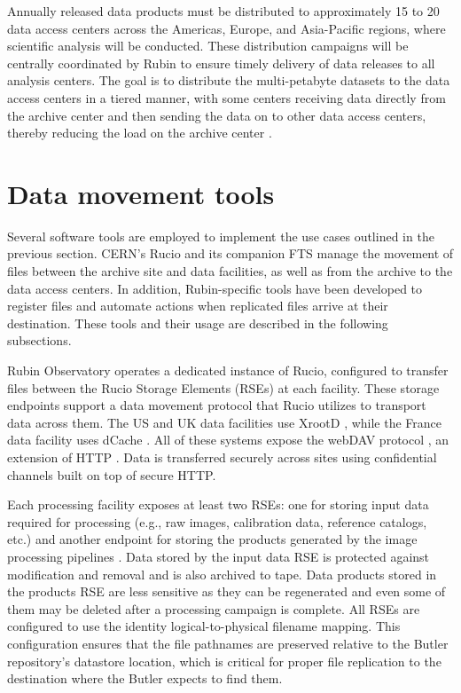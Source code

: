 \documentclass{webofc}
\begin{document}
Annually released data products must be distributed to approximately 15 to 20 data access centers across the Americas, Europe, and Asia-Pacific regions, where scientific analysis will be conducted. These distribution campaigns will be centrally coordinated by Rubin to ensure timely delivery of data releases to all analysis centers. The goal is to distribute the multi-petabyte datasets to the data access centers in a tiered manner, with some centers receiving data directly from the archive center and then sending the data on to other data access centers, thereby reducing the load on the archive center \cite{RTN-086}.

\section{Data movement tools}
\label{section-data-movement-tools}

Several software tools are employed to implement the use cases outlined in the previous section. CERN's Rucio \cite{rucio2019} and its companion FTS \cite{FTS} manage the movement of files between the archive site and data facilities, as well as from the archive to the data access centers. In addition, Rubin-specific tools have been developed to register files and automate actions when replicated files arrive at their destination. These tools and their usage are described in the following subsections.

Rubin Observatory operates a dedicated instance of Rucio, configured to transfer files between the Rucio Storage Elements (RSEs) at each facility. These storage endpoints support a data movement protocol that Rucio utilizes to transport data across them. The US and UK data facilities use XrootD \cite{xrootd}, while the France data facility uses dCache \cite{dCache}. All of these systems expose the webDAV protocol \cite{webdav}, an extension of HTTP \cite{http1.1}. Data is transferred securely across sites using confidential channels built on top of secure HTTP.

Each processing facility exposes at least two RSEs: one for storing input data required for processing (e.g., raw images, calibration data, reference catalogs, etc.) and another endpoint for storing the products generated by the image processing pipelines \cite{DMTN-213}. Data stored by the input data RSE is protected against modification and removal and is also archived to tape. Data products stored in the products RSE are less sensitive as they can be regenerated and even some of them may be deleted after a processing campaign is complete. All RSEs are configured to use the identity logical-to-physical filename mapping. This configuration ensures that the file pathnames are preserved relative to the Butler repository's datastore location, which is critical for proper file replication to the destination where the Butler expects to find them.
\end{document}

